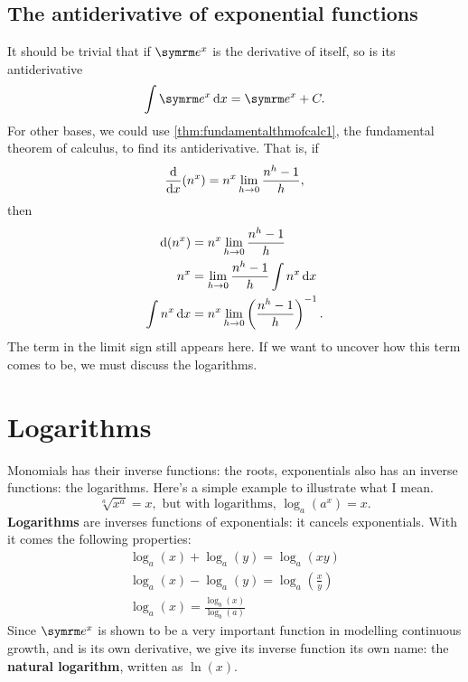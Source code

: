 \subsection{The antiderivative of exponential functions}

It should be trivial that if $\e^x$ is the derivative of itself, so is its antiderivative
\begin{equation}
    \int \e^x \dd{x} = \e^x + C.
\end{equation}
For other bases, we could use \cref{thm:fundamentalthmofcalc1}, the fundamental theorem of calculus, to find its antiderivative. That is, if
\begin{equation*}
    \dv{x}(n^x) = n^x\lim_{h \rightarrow 0}\frac{n^h - 1}{h},
\end{equation*}
then
\begin{align*}
    \dd(n^x) &= n^x\lim_{h \rightarrow 0}\frac{n^h - 1}{h} \\
    n^x &= \lim_{h \rightarrow 0}\frac{n^h - 1}{h}\int n^x\dd{x} \\
    \int n^x\dd{x} &= n^x\lim_{h \rightarrow 0}\left(\frac{n^h - 1}{h}\right)^{-1}.
\end{align*}
The term in the limit sign still appears here. If we want to uncover how this term comes to be, we must discuss the logarithms.

\section{Logarithms}

Monomials has their inverse functions: the roots, exponentials also has an inverse functions: the logarithms. Here's a simple example to illustrate what I mean.
\begin{equation*}
    \sqrt[a]{x^a} = x, \textrm{ but with logarithms, } \log_{a}(a^x) = x.
\end{equation*}
\textbf{Logarithms} are inverses functions of exponentials: it cancels exponentials. With it comes the following properties:
\begin{gather}
    \log_a(x) + \log_a(y) = \log_a(xy) \\
    \log_a(x) - \log_a(y) = \log_a\left(\frac{x}{y}\right) \\
    \log_a(x) = \frac{\log_b(x)}{\log_b(a)}
\end{gather}
Since $\e^x$ is shown to be a very important function in modelling continuous growth, and is its own derivative, we give its inverse function its own name: the \textbf{natural logarithm}, written as $\ln(x)$.

